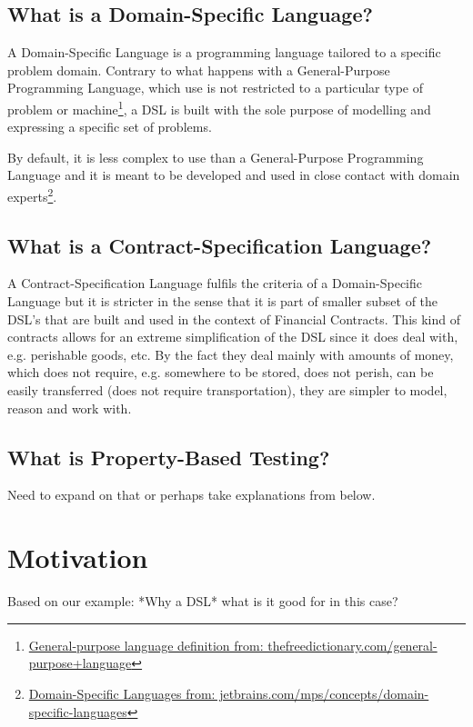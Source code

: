 \documentclass{ituthesis}
\begin{document}
\subsection{What is a Domain-Specific Language?}

A Domain-Specific Language is a programming language tailored to a specific problem domain. Contrary to what happens with a General-Purpose Programming Language, which use is not restricted to a particular type of problem or machine\footnote{\href{https://encyclopedia2.thefreedictionary.com/general-purpose+language}{General-purpose language definition from: thefreedictionary.com/general-purpose+language}}, a DSL is built with the sole purpose of modelling and expressing a specific set of problems.

By default, it is less complex to use than a General-Purpose Programming Language and it is meant to be developed and used in close contact with domain experts\footnote{\href{https://www.jetbrains.com/mps/concepts/domain-specific-languages/}{Domain-Specific Languages from: jetbrains.com/mps/concepts/domain-specific-languages}}.


    
\subsection{What is a Contract-Specification Language?}
A Contract-Specification Language fulfils the criteria of a Domain-Specific Language but it is stricter in the sense that it is part of smaller subset of the DSL's that are built and used in the context of Financial Contracts. This kind of contracts allows for an extreme simplification of the DSL since it does deal with, e.g. perishable goods, etc. By the fact they deal mainly with amounts of money, which does not require, e.g. somewhere to be stored, does not perish, can be easily transferred (does not require transportation), they are simpler to model, reason and work with.


\subsection{What is Property-Based Testing?}
Need to expand on that or perhaps take explanations from below.


\section{Motivation}
Based on our example: *Why a DSL*
what is it good for in this case?
\end{document}
